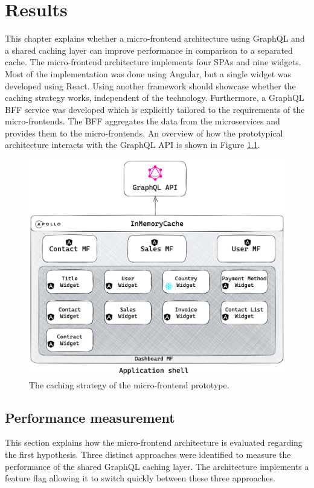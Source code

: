 \chapter{Results}\label{chapter:results}

This chapter explains whether a micro-frontend architecture using GraphQL and a shared caching layer can improve performance in comparison to a separated cache. The micro-frontend architecture implements four \acp{SPA} and nine widgets. Most of the implementation was done using Angular, but a single widget was developed using React. Using another framework should showcase whether the caching strategy works, independent of the technology. Furthermore, a GraphQL \ac{BFF} service was developed which is explicitly tailored to the requirements of the micro-frontends. The \ac{BFF} aggregates the data from the microservices and provides them to the micro-frontends. An overview of how the prototypical architecture interacts with the GraphQL \ac{API} is shown in Figure \ref{fig:results:micro-frontend-prototype}.

\ifshowImages
\begin{figure}[H]
  \centering
  \includegraphics[width=0.7\linewidth]{images/results/micro-frontend-prototype.png}
  \caption{The caching strategy of the micro-frontend prototype.}\label{fig:results:micro-frontend-prototype}
\end{figure}
\fi

\section{Performance measurement}\label{section:results:performance-measurement}

This section explains how the micro-frontend architecture is evaluated regarding the first hypothesis. Three distinct approaches were identified to measure the performance of the shared GraphQL caching layer. The architecture implements a feature flag allowing it to switch quickly between these three approaches.

